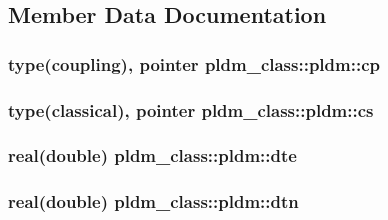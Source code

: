 \subsection{Member Data Documentation}
\hypertarget{structpldm__class_1_1pldm_a029ca44825538a8806a9383f1b04914e}{
\subsubsection[{cp}]{\setlength{\rightskip}{0pt plus 5cm}type(coupling), pointer pldm\+\_\+class\+::pldm\+::cp\hspace{0.3cm}{\ttfamily [private]}}}\label{structpldm__class_1_1pldm_a029ca44825538a8806a9383f1b04914e}
\hypertarget{structpldm__class_1_1pldm_a2366c673bb4049d423c1605f801c49ab}{
\subsubsection[{cs}]{\setlength{\rightskip}{0pt plus 5cm}type(classical), pointer pldm\+\_\+class\+::pldm\+::cs\hspace{0.3cm}{\ttfamily [private]}}}\label{structpldm__class_1_1pldm_a2366c673bb4049d423c1605f801c49ab}
\hypertarget{structpldm__class_1_1pldm_a59460330dd0feba03a287ac14711d9a8}{
\subsubsection[{dte}]{\setlength{\rightskip}{0pt plus 5cm}real(double) pldm\+\_\+class\+::pldm\+::dte\hspace{0.3cm}{\ttfamily [private]}}}\label{structpldm__class_1_1pldm_a59460330dd0feba03a287ac14711d9a8}
\hypertarget{structpldm__class_1_1pldm_a03a577c0a1845e2f6b01ab5aacb9bd0f}{
\subsubsection[{dtn}]{\setlength{\rightskip}{0pt plus 5cm}real(double) pldm\+\_\+class\+::pldm\+::dtn\hspace{0.3cm}{\ttfamily [private]}}}\label{structpldm__class_1_1pldm_a03a577c0a1845e2f6b01ab5aacb9bd0f}
